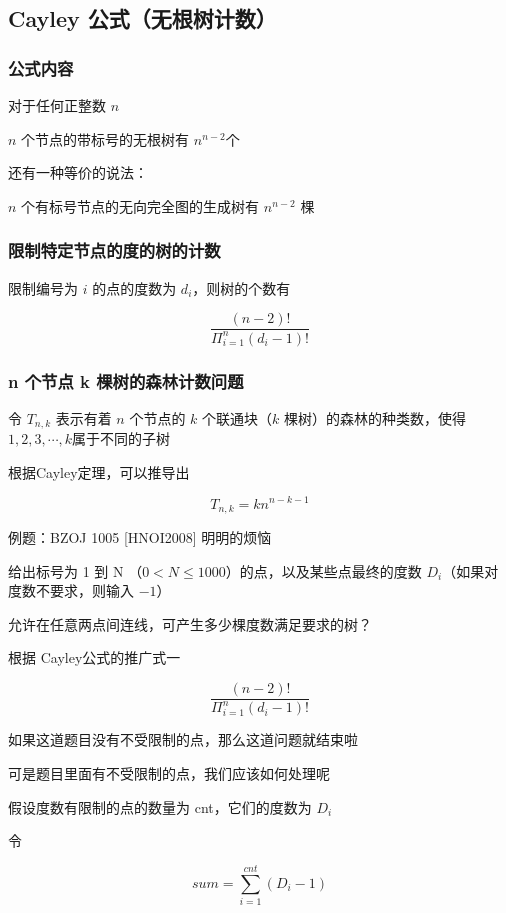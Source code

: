 \subsection{Cayley 公式（无根树计数）}

\subsubsection{公式内容}

对于任何正整数 $n$

$n$ 个节点的带标号的无根树有 $n^{n − 2}$个

还有一种等价的说法：

$n$ 个有标号节点的无向完全图的生成树有 $n^{n − 2}$ 棵

\subsubsection{限制特定节点的度的树的计数}

限制编号为 $i$ 的点的度数为 $d_ {i}$，则树的个数有

$$\frac{(n - 2)!}{\Pi_{i = 1} ^ {n} (d_{i} - 1)!}$$

\subsubsection{n 个节点 k 棵树的森林计数问题}

令 $T _ {n, k}$ 表示有着 $n$ 个节点的 $k$ 个联通块（$k$ 棵树）的森林的种类数，使得$1, 2, 3, \cdots, k$属于不同的子树

根据Cayley定理，可以推导出

$$T_{n, k} = k n^{n − k - 1}$$

例题：BZOJ 1005 [HNOI2008] 明明的烦恼

给出标号为 1 到 N （$0 < N \le 1000$）的点，以及某些点最终的度数 $D _ i$（如果对度数不要求，则输入  $-1$）

允许在任意两点间连线，可产生多少棵度数满足要求的树？

根据 Cayley公式的推广式一

$$\frac{(n − 2)!} {\Pi ^ {n} _{i = 1} (d_i − 1)!}$$

如果这道题目没有不受限制的点，那么这道问题就结束啦

可是题目里面有不受限制的点，我们应该如何处理呢

假设度数有限制的点的数量为 cnt，它们的度数为 $D_i$

令

$$sum = \sum _{i = 1} ^ {cnt} (D_i - 1)$$

